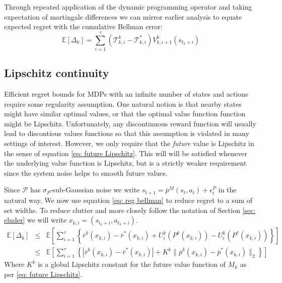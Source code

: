 \documentclass{article}
\newcommand{\Exp}{\mathds{E}}
\newcommand{\Pc}{\mathcal{P}}
\newcommand{\Tc}{\mathcal{T}}
\begin{document}
Through repeated application of the dynamic programming operator and taking expectation of martingale differences we can mirror earlier analysis \cite{osband2013more} to equate expected regret with the cumulative Bellman error:
\begin{equation}
\label{eq: reg bellman}
	\Exp [ \Delta_k ] = \sum_{i=1}^\tau (\Tc^k_{k,i}-\Tc^*_{k,i})V^k_{k,i+1}(s_{t_k+i})
\end{equation}


\subsection{Lipschitz continuity}
\label{sec: lipschitz}
Efficient regret bounds for MDPs with an infinite number of states and actions require some regularity assumption.
One natural notion is that nearby states might have similar optimal values, or that the optimal value function function might be Lipschitz.
Unfortunately, any discontinuous reward function will usually lead to discontious values functions so that this assumption is violated in many settings of interest.
However, we only require that the \emph{future} value is Lipschitz in the sense of equation \eqref{eq: future Lipschitz}.
This will will be satisfied whenever the underlying value function is Lipschitz, but is a strictly weaker requirement since the system noise helps to smooth future values.

Since $\Pc$ has $\sigma_P$-sub-Gaussian noise we write $s_{t+1} = \overline{p}^M(s_t,a_t)+\epsilon^P_t$ in the natural way.
We now use equation \eqref{eq: reg bellman} to reduce regret to a sum of set widths.
To reduce clutter and more closely follow the notation of Section \ref{sec: eluder} we will write $x_{k,i}=(s_{t_k+i},a_{t_k+i})$.
\begin{eqnarray}
	\Exp [ \Delta_k ] &\le& \Exp \left[ \sum_{i=1}^\tau \left\{  \overline{r}^k(x_{k,i}) - \overline{r}^*(x_{k,i})
	+  U^k_{i}(P^k(x_{k,i})) - U^k_{i}(P^*(x_{k,i})) \right\} \right] \nonumber \\
	&\le& \Exp\left[ \sum_{i=1}^\tau \left\{ | \overline{r}^k(x_{k,i}) - \overline{r}^*(x_{k,i})|
	+ K^k \|\overline{p}^k(x_{k,i}) - \overline{p}^*(x_{k,i}) \|_2 \right\}\right]
\end{eqnarray}
Where $K^k$ is a global Lipschitz constant for the future value function of $M_k$ as per \eqref{eq: future Lipschitz}.
\end{document}
